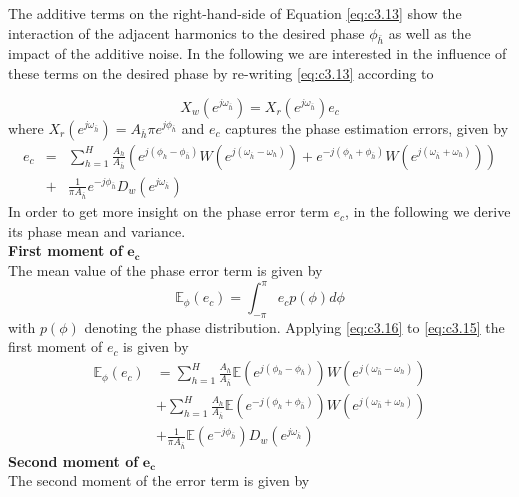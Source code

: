 The additive terms on the right-hand-side of Equation \eqref{eq:c3.13} show the interaction of the adjacent harmonics to the desired phase $\phi_{\bar{h}}$ as well as the impact of the additive noise. In the following we are interested in the influence of these terms on the desired phase by re-writing \eqref{eq:c3.13} according to

\begin{equation}\label{eq:c3.14}
	X_w(e^{j\omega_{\bar{h}}})=X_r(e^{j\omega_{\bar{h}}})e_c
\end{equation}
where $X_r(e^{j\omega_{\bar{h}}})=A_{\bar{h}}\pi e^{j\phi_{\bar{h}}}$ and $e_c$ captures the phase estimation errors, given by
\begin{eqnarray}\label{eq:c3.15}
	e_c&=&\sum_{h=1}^H\frac{A_h}{A_{\bar{h}}}\left( e^{j(\phi_h-\phi_{\bar{h}})}W(e^{j(\omega_{\bar{h}}-\omega_h)})+ e^{-j(\phi_h+\phi_{\bar{h}})}W(e^{j(\omega_{\bar{h}}+\omega_h)}) \right)\nonumber\\
	&+& \frac{1}{\pi A_{\bar{h}}}e^{-j\phi_{\bar{h}}}D_w(e^{j\omega_{\bar{h}}})
\end{eqnarray}
In order to get more insight on the phase error term $e_c$, in the following we derive its phase mean and variance.\\
\textbf{First moment of }$\boldsymbol{e_c}$~\\
\noindent The mean value of the phase error term is given by
\begin{equation}\label{eq:c3.16}
	\mathbb{E}_\phi(e_c)=\int_{-\pi}^\pi e_c p(\phi)d\phi
\end{equation}
with $p(\phi)$ denoting the phase distribution. Applying \eqref{eq:c3.16} to \eqref{eq:c3.15} the first moment of $e_c$ is given by
\begin{equation}\label{eq:c3.17}
	\begin{split}
		\mathbb{E}_\phi(e_c) &= \sum_{h=1}^H\frac{A_h}{A_{\bar{h}}} \mathbb{E}(e^{j(\phi_h-\phi_{\bar{h}})})W(e^{j(\omega_{\bar{h}}-\omega_h)})\\
		&+ \sum_{h=1}^H\frac{A_h}{A_{\bar{h}}} \mathbb{E}(e^{-j(\phi_h+\phi_{\bar{h}})})W(e^{j(\omega_{\bar{h}}+\omega_h)})\\
		&+ \frac{1}{\pi A_{\bar{h}}}\mathbb{E}(e^{-j\phi_{\bar{h}}})D_w(e^{j\omega_{\bar{h}}})
	\end{split}
\end{equation}
\textbf{Second moment of }$\boldsymbol{e_c}$~\\
\noindent {}The second moment of the error term is given by
